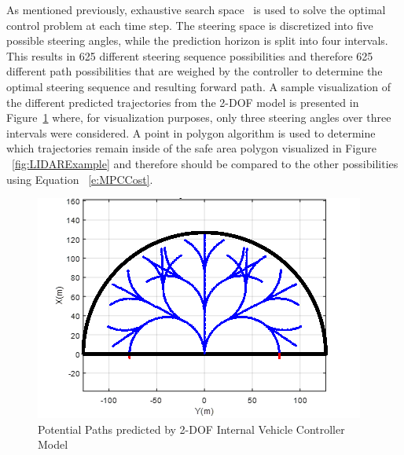 \documentclass[12pt,onecolumn]{report}
\begin{document}
As mentioned previously, exhaustive search space~\cite{ModelFidelity2016} is used to solve the optimal control problem at each time step. The steering space is discretized into five possible steering angles, while the prediction horizon is split into four intervals. This results in 625 different steering sequence possibilities and therefore 625 different path possibilities that are weighed by the controller to determine the optimal steering sequence and resulting forward path. A sample visualization of the different predicted trajectories from the 2-DOF model is presented in Figure~\ref{fig:PossiblePaths} where, for visualization purposes, only three steering angles over three intervals were considered. A point in polygon algorithm is used to determine which trajectories remain inside of the safe area polygon visualized in Figure ~\ref{fig:LIDARExample} and therefore should be compared to the other possibilities using Equation ~\ref{e:MPCCost}.

\begin{figure}
	\centering
	\includegraphics[width=0.8\columnwidth]{Figs/PathPossibilities.png}
	\caption{\small Potential Paths predicted by 2-DOF Internal Vehicle Controller Model}  
	\label{fig:PossiblePaths}
\end{figure}
 
\end{document}
